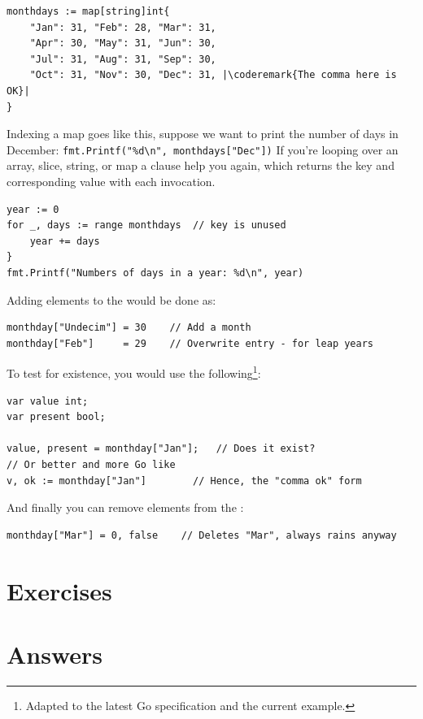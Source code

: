\begin{lstlisting}
monthdays := map[string]int{
	"Jan": 31, "Feb": 28, "Mar": 31, 
	"Apr": 30, "May": 31, "Jun": 30, 
	"Jul": 31, "Aug": 31, "Sep": 30, 
	"Oct": 31, "Nov": 30, "Dec": 31, |\coderemark{The comma here is OK}|
}		    
\end{lstlisting}
Indexing a map goes like this, suppose we want to print the
number of days in December: \lstinline{fmt.Printf("%d\n", monthdays["Dec"])}\newline
If you're looping over an array, slice, string, or map a 
clause help you again, which returns the key and corresponding value
with each invocation.
\begin{lstlisting}
year := 0
for _, days := range monthdays  // key is unused
    year += days
}
fmt.Printf("Numbers of days in a year: %d\n", year)
\end{lstlisting}
Adding elements to the  would be done as:
\begin{lstlisting}
monthday["Undecim"] = 30	// Add a month
monthday["Feb"]     = 29	// Overwrite entry - for leap years
\end{lstlisting}
To test for existence, you would use the
following\cite{go_course_day2}\footnote{Adapted to the latest Go
specification and the current example.}:
\begin{lstlisting}
var value int;
var present bool;

value, present = monthday["Jan"];	// Does it exist?
// Or better and more Go like
v, ok := monthday["Jan"]		// Hence, the "comma ok" form
\end{lstlisting}
And finally you can remove elements from the :
\begin{lstlisting}
monthday["Mar"] = 0, false    // Deletes "Mar", always rains anyway
\end{lstlisting}

\section{Exercises}







\cleardoublepage
\section{Answers}
\shipoutAnswer
